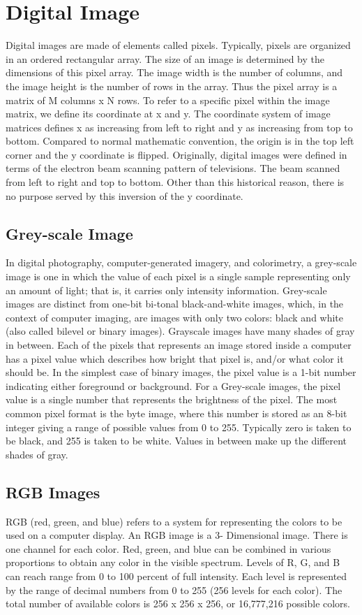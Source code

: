 \documentclass[a4paper, 10pt]{book}
\begin{document}
\section{ Digital Image}
Digital images are made of elements called pixels.  Typically, pixels are organized in an ordered rectangular array.  The size of an image is determined by the dimensions of this pixel array.  The image width is the number of columns, and the image height is the number of rows in the array.  Thus the pixel array is a matrix of M columns x N rows.  To refer to a specific pixel within the image matrix, we define its coordinate at x and y.  The coordinate system of image matrices defines x as increasing from left to right and y as increasing from top to bottom.  Compared to normal mathematic convention, the origin is in the top left corner and the y coordinate is flipped. Originally, digital images were defined in terms of the electron beam scanning pattern of televisions.  The beam scanned from left to right and top to bottom.  Other than this historical reason, there is no purpose served by this inversion of the y coordinate.
\subsection{Grey-scale Image}
In digital photography, computer-generated imagery, and colorimetry, a grey-scale image is one in which the value of each pixel is a single sample representing only an amount of light; that is, it carries only intensity information. 
Grey-scale images are distinct from one-bit bi-tonal black-and-white images, which, in the context of computer imaging, are images with only two colors: black and white (also called bilevel or binary images). Grayscale images have many shades of gray in between.
Each of the pixels that represents an image stored inside a computer has a pixel value which describes how bright that pixel is, and/or what color it should be. In the simplest case of binary images, the pixel value is a 1-bit number indicating either foreground or background. For a Grey-scale images, the pixel value is a single number that represents the brightness of the pixel. The most common pixel format is the byte image, where this number is stored as an 8-bit integer giving a range of possible values from 0 to 255. Typically zero is taken to be black, and 255 is taken to be white. Values in between make up the different shades of gray.
\subsection{RGB  Images}
RGB (red, green, and blue) refers to a system for representing the colors to be used on a computer display. An RGB image is a 3- Dimensional image. There is one channel for each color. Red, green, and blue can be combined in various proportions to obtain any color in the visible spectrum. Levels of R, G, and B can reach range from 0 to 100 percent of full intensity. Each level is represented by the range of decimal numbers from 0 to 255 (256 levels for each color). The total number of available colors is 256 x 256 x 256, or 16,777,216 possible colors.
\end{document}
